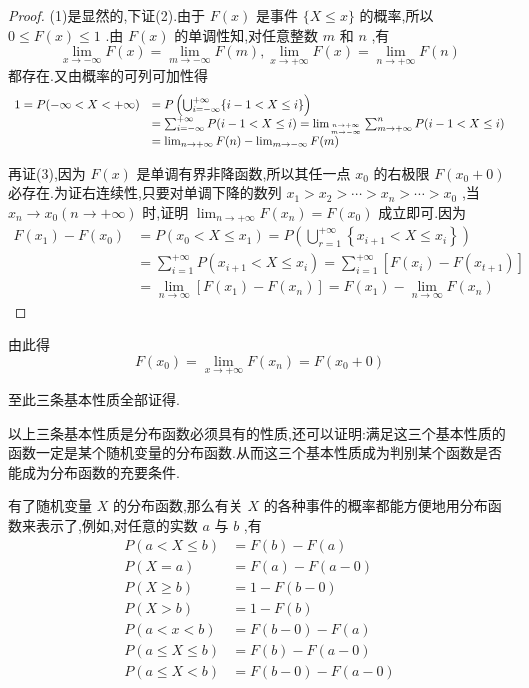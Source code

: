 \begin{proof}
	(1)是显然的,下证(2).由于 $ F(x) $ 是事件 $ \{X \leqslant x\} $ 的概率,所以 $ 0\leq 
	F(x)\leq 1 $ .由 $ F(x) $ 的单调性知,对任意整数 $ m $ 和 $ n $ ,有
	\[ 
	\lim _{x \rightarrow-\infty} F(x)=\lim _{m \rightarrow-\infty} F(m), \lim _{x \rightarrow+\infty} F(x)=\lim _{n \rightarrow+\infty} F(n)
	\]
	都存在.又由概率的可列可加性得
	\[ 
	\begin{array}{ll}
	1=P(-\infty<X<+\infty)&=P\left(\bigcup_{i=-\infty}^{+\infty}\{i-1<X \leqslant i\}\right) \\ 
	&=\sum_{i=-\infty}^{+\infty} P(i-1<X \leqslant i)=\lim _{n \rightarrow+\infty \atop m \rightarrow-\infty} \sum_{m \rightarrow+\infty}^{n} P(i-1<X \leqslant i) \\ 
	&=\lim _{n \rightarrow+\infty} F(n)-\lim _{m \rightarrow-\infty} F(m)
	\end{array}
	\]
	
	再证(3),因为 $ F(x) $ 是单调有界非降函数,所以其任一点 $ x_0 $ 的右极限 $ F(x_0+0) $ 必存在.为证右连续性,只要对单调下降的数列 $ x_{1}>x_{2}>\cdots>x_{n}>\cdots>x_{0} $ ,当 $ x_{n} \rightarrow x_{0}(n \rightarrow+\infty) $ 时,证明 $ \lim _{n \rightarrow+\infty} F\left(x_{n}\right)=F\left(x_{0}\right) $ 成立即可.因为
	\[ \begin{array}{ll}
	F\left(x_{1}\right)-F\left(x_{0}\right)&=P\left(x_{0}<X \leqslant x_{1}\right)=P\left(\bigcup_{r=1}^{+\infty}\left\{x_{i+1}<X \leqslant x_{i}\right\}\right) \\
	&=\sum_{i=1}^{+\infty} P\left(x_{i+1}<X \leqslant x_{i}\right)=\sum_{i=1}^{+\infty}\left[F\left(x_{i}\right)-F\left(x_{t+1}\right)\right] \\
	&=\lim _{n \rightarrow \infty}\left[F\left(x_{1}\right)-F\left(x_{n}\right)\right]=F\left(x_{1}\right)-\lim _{n \rightarrow \infty} F\left(x_{n}\right)
	\end{array}\]
\end{proof}

由此得
\[ 
F\left(x_{0}\right)=\lim _{x \rightarrow+\infty} F\left(x_{n}\right)=F\left(x_{0}+0\right)
\]

至此三条基本性质全部证得.

以上三条基本性质是分布函数必须具有的性质,还可以证明:满足这三个基本性质的函数一定是某个随机变量的分布函数.从而这三个基本性质成为判别某个函数是否能成为分布函数的充要条件.

有了随机变量 $ X $ 的分布函数,那么有关 $ X $ 的各种事件的概率都能方便地用分布函数来表示了,例如,对任意的实数 $ a $ 与 $ b $ ,有
\[ 
\begin{array}{rl}
P(a<X \leqslant b)&=F(b)-F(a)\\ 
P(X=a)&=F(a)-F(a-0) \\
P(X \geqslant b)&=1-F(b-0)\\
P(X>b)&=1-F(b)\\ 
P(a<x<b)&=F(b-0)-F(a)\\
P(a \leqslant X \leqslant b)&=F(b)-F(a-0)\\ 
P(a \leqslant X<b)&=F(b-0)-F(a-0)
\end{array}
\]

